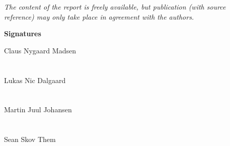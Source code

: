{\footnotesize\itshape The content of the report is freely available, but publication (with source reference) may only take place in agreement with the authors.}

\pagebreak
\thispagestyle{empty}

\textbf{Signatures}

Claus Nygaard Madsen\\\\
\makebox[3in]{\hrulefill}\\

Lukas Nic Dalgaard\\\\
\makebox[3in]{\hrulefill}\\

Martin Juul Johansen\\\\
\makebox[3in]{\hrulefill}\\

Sean Skov Them \\\\
\makebox[3in]{\hrulefill}\\